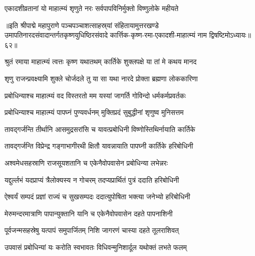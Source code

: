 \twolineshloka
{एकादशीव्रतानां यो माहात्म्यं शृणुते नरः}
{सर्वपापविनिर्मुक्तो विष्णुलोके महीयते}%

॥इति श्रीपाद्मे महापुराणे पञ्चपञ्चाशत्साहस्र्यां संहितायामुत्तरखण्डे उमापतिनारदसंवादान्तर्गतकृष्णयुधिष्ठिरसंवादे कार्त्तिक-कृष्ण-रमा-एकादशी-माहात्म्यं नाम द्विषष्टिमोऽध्यायः॥६२॥


\hyperref[sec:ekadashi_mahatmyam_padma_puranam]{\closesub}
\clearpage

\label{sec:padma-karttika-shukla-prabodhini}



\twolineshloka
{श्रुतं रमाया माहात्म्यं त्वत्तः कृष्ण यथातथम्}
{कार्तिके शुक्लपक्षे या तां मे कथय मानद}%


\twolineshloka
{शृणु राजन्प्रवक्ष्यामि शुक्ले चोर्जदले तु या}
{सा यथा नारदे प्रोक्ता ब्रह्मणा लोककारिणा}%


\twolineshloka
{प्रबोधिन्याश्च माहात्म्यं वद विस्तरतो मम}
{यस्यां जागर्ति गोविन्दो धर्मकर्मप्रवर्तकः}%


\twolineshloka
{प्रबोधिन्याश्च माहात्म्यं पापघ्नं पुण्यवर्धनम्}
{मुक्तिप्रदं सुबुद्धीनां शृणुष्व मुनिसत्तम}%

\twolineshloka
{तावद्गर्जन्ति तीर्थानि आसमुद्रसरांसि च}
{यावत्प्रबोधिनी विष्णोस्तिथिर्नायाति कार्तिके}%

\twolineshloka
{तावद्गर्जन्ति विप्रेन्द्र गङ्गाभागीरथी क्षितौ}
{यावन्नायाति पापघ्नी कार्तिके हरिबोधिनी}%

\twolineshloka
{अश्वमेधसहस्राणि राजसूयशतानि च}
{एकेनैवोपवासेन प्रबोधिन्या लभेन्नरः}%

\twolineshloka
{यद्दुर्ल्लभं यदप्राप्यं त्रैलोक्यस्य न गोचरम्}
{तदप्यप्रार्थितं पुत्रं ददाति हरिबोधिनी}%

\twolineshloka
{ऐश्वर्यं सम्पदं प्रज्ञां राज्यं च सुखसम्पदः}
{ददात्युपोषिता भक्त्या जनेभ्यो हरिबोधिनी}%

\twolineshloka
{मेरुमन्दरमात्राणि पापान्युक्तानि यानि च}
{एकेनैवोपवासेन दहते पापनाशिनी}%

\twolineshloka
{पूर्वजन्मसहस्रेषु यत्पापं समुपार्जितम्}
{निशि जागरणं चास्या दहते तूलराशिवत्}%

\twolineshloka
{उपवासं प्रबोधिन्यां यः करोति स्वभावतः}
{विधिवन्मुनिशार्दूल यथोक्तं लभते फलम्}%

